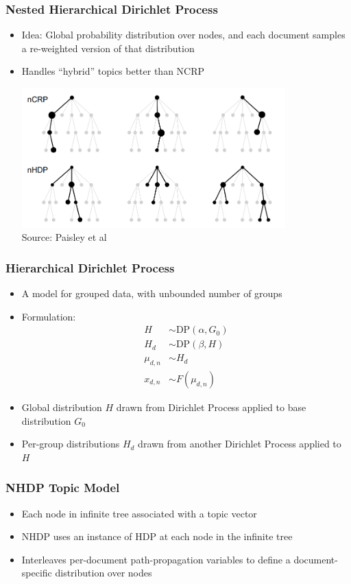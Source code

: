 \begin{frame}
\frametitle{Nested Hierarchical Dirichlet Process}
\begin{itemize}[<+->]
\item Idea: Global probability distribution over nodes, and each document samples a re-weighted version of that distribution
\item Handles ``hybrid'' topics better than NCRP
\begin{center}
\includegraphics[width=0.8\textwidth]{../figures/ncrp_vs_nhdp.png} \\
\footnotesize Source: Paisley et al \cite{paisley2015nhdp}
\end{center}
\end{itemize}
\end{frame}

\begin{frame}
\frametitle{Hierarchical Dirichlet Process}
\begin{itemize}[<+->]
\item A model for grouped data, with unbounded number of groups
\item Formulation:
\begin{align*}
H &\sim \text{DP}(\alpha, G_0) \\
H_d &\sim \text{DP}(\beta, H) \\
\mu_{d,n} &\sim H_d \\
x_{d,n} &\sim F(\mu_{d,n})
\end{align*}
\item Global distribution $H$ drawn from Dirichlet Process applied to base distribution $G_0$
\item Per-group distributions $H_d$ drawn from another Dirichlet Process applied to $H$
\end{itemize}
\end{frame}

\begin{frame}
\frametitle{NHDP Topic Model}
\begin{itemize}[<+->]
\item Each node in infinite tree associated with a topic vector
\item NHDP uses an instance of HDP at each node in the infinite tree
\item Interleaves per-document path-propagation variables to define a document-specific distribution over nodes
\end{itemize}
\end{frame}

